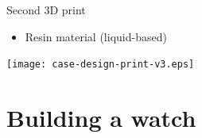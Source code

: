 \documentclass[compress,red]{beamer}
\begin{document}
\begin{frame}{Second 3D print}

  \begin{itemize}
  \item Resin material (liquid-based)
  \end{itemize}

  \begin{center}
    \texttt{[image: case-design-print-v3.eps]}
  \end{center}

\end{frame}



\section{Building a watch}

\subsection*{} %
\end{document}
